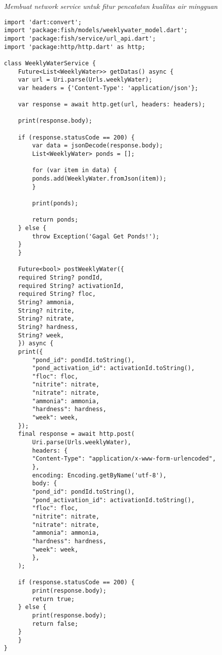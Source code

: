 	\textit{Membuat network service untuk fitur pencatatan kualitas air mingguan}
	\begin{lstlisting}
import 'dart:convert';
import 'package:fish/models/weeklywater_model.dart';
import 'package:fish/service/url_api.dart';
import 'package:http/http.dart' as http;

class WeeklyWaterService {
    Future<List<WeeklyWater>> getDatas() async {
    var url = Uri.parse(Urls.weeklyWater);
    var headers = {'Content-Type': 'application/json'};

    var response = await http.get(url, headers: headers);

    print(response.body);

    if (response.statusCode == 200) {
        var data = jsonDecode(response.body);
        List<WeeklyWater> ponds = [];

        for (var item in data) {
        ponds.add(WeeklyWater.fromJson(item));
        }

        print(ponds);

        return ponds;
    } else {
        throw Exception('Gagal Get Ponds!');
    }
    }

    Future<bool> postWeeklyWater({
    required String? pondId,
    required String? activationId,
    required String? floc,
    String? ammonia,
    String? nitrite,
    String? nitrate,
    String? hardness,
    String? week,
    }) async {
    print({
        "pond_id": pondId.toString(),
        "pond_activation_id": activationId.toString(),
        "floc": floc,
        "nitrite": nitrate,
        "nitrate": nitrate,
        "ammonia": ammonia,
        "hardness": hardness,
        "week": week,
    });
    final response = await http.post(
        Uri.parse(Urls.weeklyWater),
        headers: {
        "Content-Type": "application/x-www-form-urlencoded",
        },
        encoding: Encoding.getByName('utf-8'),
        body: {
        "pond_id": pondId.toString(),
        "pond_activation_id": activationId.toString(),
        "floc": floc,
        "nitrite": nitrate,
        "nitrate": nitrate,
        "ammonia": ammonia,
        "hardness": hardness,
        "week": week,
        },
    );

    if (response.statusCode == 200) {
        print(response.body);
        return true;
    } else {
        print(response.body);
        return false;
    }
    }
}        
	\end{lstlisting}

	\clearpage
